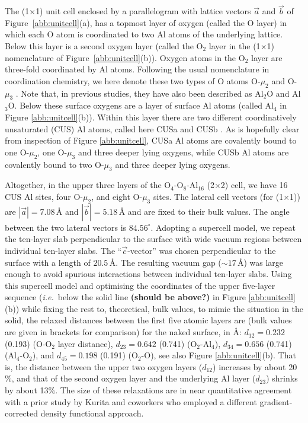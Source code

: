 \documentclass[twoside,twocolumn,9pt]{article}
\begin{document}
The (1$\times$1) unit cell enclosed by a parallelogram with lattice vectors $\vec{a}$ and $\vec{b}$ of Figure~\ref{abb:unitcell}(a), has a topmost layer of oxygen (called the O layer) in which each O atom is coordinated to two Al atoms of the underlying lattice. Below this layer is a second oxygen layer (called the O$_2$ layer in the (1$\times$1) nomenclature of Figure~\ref{abb:unitcell}(b)). Oxygen atoms in the O$_2$ layer are three-fold coordinated by Al atoms. Following the usual nomenclature in coordination chemistry, we here denote these two types of O atoms O-$\mu_2$ and O-$\mu_3$ \cite{iupac-bridge}. Note that, in previous studies, they have also been described as Al$_{2}$O and Al$_{3}$O\cite{sung2012107}. Below these surface oxygens are a layer of surface Al atoms (called Al$_4$ in Figure \ref{abb:unitcell}(b)). Within this layer there are two different coordinatively unsaturated (CUS) Al atoms, called here CUSa and CUSb \cite{catalano2006108}. As is hopefully clear from inspection of Figure \ref{abb:unitcell}, CUSa Al atoms are covalently bound to one O-$\mu_2$, one O-$\mu_3$ and three deeper lying oxygens, while CUSb Al atoms are covalently bound to two O-$\mu_3$ and three deeper lying oxygens.    

Altogether, in the upper three layers of the O$_4$-O$_8$-Al$_{16}$ (2$\times$2) cell, we have 16 CUS Al sites, four O-$\mu_2$, and eight O-$\mu_3$ sites. The lateral cell vectors (for (1$\times$1)) are $|\vec{a}|=7.08\,$\AA{} and $|\vec{b}|=5.18\,$\AA{} and are fixed to their bulk values. The angle between the two lateral vectors is $84.56^{\circ}$. Adopting a supercell model, we repeat the ten-layer slab perpendicular to the surface with wide vacuum regions between individual ten-layer slabs. The ``$\vec{c}$-vector'' was chosen perpendicular to the surface with a length of $20.5\,$\AA. The resulting vacuum gap ($\sim 17\,$\AA) was large enough to avoid spurious interactions between individual ten-layer slabs. Using this supercell model and optimising the coordinates of the upper five-layer sequence (\textit{i.e.}\ below the solid line \textbf{(should be above?)} in Figure \ref{abb:unitcell}(b)) while fixing the rest to, theoretical, bulk values, to mimic the situation in the solid, the relaxed distances between the first five atomic layers are (bulk values are given in brackets for comparison) for the naked surface, in \AA: $d_{12}=0.232$ (0.193) (O-O$_2$ layer distance), $d_{23}=0.642$ (0.741) (O$_2$-Al$_4$), $d_{34}=0.656$ (0.741) (Al$_4$-O$_2$), and $d_{45}=0.198$ (0.191) (O$_2$-O), see also Figure \ref{abb:unitcell}(b). That is, the distance between the upper two oxygen layers ($d_{12}$) increases by about 20$\%$, and that of the second oxygen layer and the underlying Al layer ($d_{23}$) shrinks by about 13$\%$. The size of these relaxations are in near quantitative agreement with a prior study by Kurita and coworkers\cite{kuri10} who employed a different gradient-corrected density functional approach.
\end{document}
